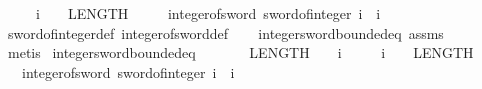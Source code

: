\begin{isabellebody}
\ \ \ \ \ {\isachardoublequoteopen}i\ {\isacharless}{\kern0pt}\ {}\ {\isacharcircum}{\kern0pt}\ {\isacharparenleft}{\kern0pt}LENGTH{\isacharparenleft}{\kern0pt}{}{}{\isacharparenright}{\kern0pt}\ {\isacharminus}{\kern0pt}\ {}{\isacharparenright}{\kern0pt}{\isachardoublequoteclose}\isanewline
\ \ \ {\isachardoublequoteopen}integer{\isacharunderscore}{\kern0pt}of{\isacharunderscore}{\kern0pt}sword{}{}\ {\isacharparenleft}{\kern0pt}sword{}{}{\isacharunderscore}{\kern0pt}of{\isacharunderscore}{\kern0pt}integer\ i{\isacharparenright}{\kern0pt}\ {\isacharequal}{\kern0pt}\ i{\isachardoublequoteclose}\isanewline
%
\isadelimproof
\ \ %
\endisadelimproof
%
\isatagproof
{}\isamarkupfalse%
\ sword{}{}{\isacharunderscore}{\kern0pt}of{\isacharunderscore}{\kern0pt}integer{\isacharunderscore}{\kern0pt}def\ integer{\isacharunderscore}{\kern0pt}of{\isacharunderscore}{\kern0pt}sword{}{}{\isacharunderscore}{\kern0pt}def\isanewline
\ \ \isamarkupfalse%
\ integer{\isacharunderscore}{\kern0pt}sword{\isacharunderscore}{\kern0pt}bounded{\isacharunderscore}{\kern0pt}eq\ assms\isanewline
\ \ \isamarkupfalse%
\ metis%
\endisatagproof
{\isafoldproof}%
%
\isadelimproof
\isanewline
%
\endisadelimproof
\isanewline
{}\isamarkupfalse%
\ integer{\isacharunderscore}{\kern0pt}sword{}{}{\isacharunderscore}{\kern0pt}bounded{\isacharunderscore}{\kern0pt}eq{\isacharcolon}{\kern0pt}\isanewline
\ \ \ \ {\isachardoublequoteopen}{\isacharminus}{\kern0pt}\ {\isacharparenleft}{\kern0pt}{}\ {\isacharcircum}{\kern0pt}\ {\isacharparenleft}{\kern0pt}LENGTH{\isacharparenleft}{\kern0pt}{}{}{\isacharparenright}{\kern0pt}\ {\isacharminus}{\kern0pt}\ {}{\isacharparenright}{\kern0pt}{\isacharparenright}{\kern0pt}\ {\isasymle}\ i{\isachardoublequoteclose}\isanewline
\ \ \ \ \ {\isachardoublequoteopen}i\ {\isacharless}{\kern0pt}\ {}\ {\isacharcircum}{\kern0pt}\ {\isacharparenleft}{\kern0pt}LENGTH{\isacharparenleft}{\kern0pt}{}{}{\isacharparenright}{\kern0pt}\ {\isacharminus}{\kern0pt}\ {}{\isacharparenright}{\kern0pt}{\isachardoublequoteclose}\isanewline
\ \ \ {\isachardoublequoteopen}integer{\isacharunderscore}{\kern0pt}of{\isacharunderscore}{\kern0pt}sword{}{}\ {\isacharparenleft}{\kern0pt}sword{}{}{\isacharunderscore}{\kern0pt}of{\isacharunderscore}{\kern0pt}integer\ i{\isacharparenright}{\kern0pt}\ {\isacharequal}{\kern0pt}\ i{\isachardoublequoteclose}\isanewline

\end{isabellebody}
